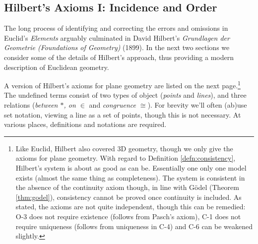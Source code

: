 \subsection{Hilbert's Axioms I: Incidence and Order}\label{sec:hilbert1}

The long process of identifying and correcting the errors and omissions in Euclid's \emph{Elements} arguably culminated in David Hilbert's \emph{Grundlagen der Geometrie (Foundations of Geometry)} (1899). In the next two sections we consider some of the details of Hilbert's approach, thus providing a modern description of Euclidean geometry.\smallbreak

A version of Hilbert's axioms for plane geometry are listed on the next page.\footnote{%
	Like Euclid, Hilbert also covered 3D geometry, though we only give the axioms for plane geometry. With regard to Definition \ref{defn:consistency}, Hilbert's system is about as good as can be. Essentially one only one model exists (almost the same thing as completeness). The system is consistent in the absence of the continuity axiom though, in line with Gödel (Theorem \ref{thm:godel}), consistency cannot be proved once continuity is included. As stated, the axioms are not quite independent, though this can be remedied: O-3 does not require existence (follows from Pasch's axiom), C-1 does not require uniqueness (follows from uniqueness in C-4) and C-6 can be weakened slightly.%
}
The undefined terms consist of two types of object (\emph{points} and \emph{lines}), and three relations (\emph{between $*$, on $\in$} and \emph{congruence $\cong$}). For brevity we'll often (ab)use set notation, viewing a line as a set of points, though this is not necessary. At various places, definitions and notations are required.

